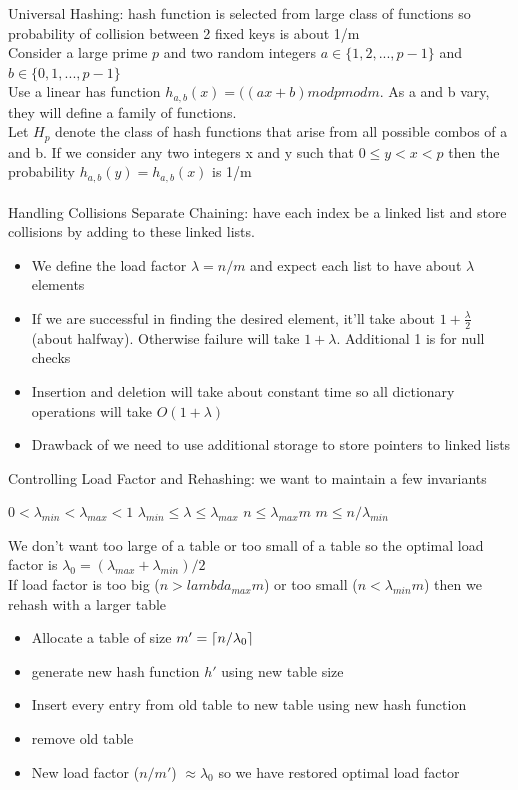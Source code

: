 \documentclass{article}
\DeclarePairedDelimiter{\ceil}{\lceil}{\rceil}
\begin{document}
  Universal Hashing: hash function is selected from large class of functions so probability of collision between 2 fixed keys is about 1/m\\
  Consider a large prime $p$ and two random integers $a \in \{1, 2, ..., p-1\}$ and $b \in \{0, 1, ..., p-1\}$ \\
  Use a linear has function $h_{a,b}(x) = ((ax + b) mod p mod m$. As a and b vary, they will define a family of functions.\\
  Let $H_{p}$ denote the class of hash functions that arise from all possible combos of a and b. If we consider any two integers x and y such that $0 \leq y < x < p$ then the probability $h_{a,b}(y) = h_{a,b}(x)$ is 1/m\\ \\
  Handling Collisions Separate Chaining: have each index be a linked list and store collisions by adding to these linked lists.
    \begin{itemize}[noitemsep]
    \item We define the load factor $\lambda = n/m$ and expect each list to have about $\lambda$ elements
    \item If we are successful in finding the desired element, it'll take about $1 + \frac{\lambda}{2}$ (about halfway). Otherwise failure will take $1 + \lambda$. Additional 1 is for null checks
    \item Insertion and deletion will take about constant time so all dictionary operations will take $O(1 + \lambda)$
    \item Drawback of we need to use additional storage to store pointers to linked lists
    \end{itemize}
  Controlling Load Factor and Rehashing: we want to maintain a few invariants
  \begin{center} 
    $0 < \lambda_{min} < \lambda_{max} < 1$ \quad $\lambda_{min} \leq \lambda \leq \lambda_{max}$ \quad $n \leq \lambda_{max}m$ \quad $m \leq n/\lambda_{min}$
  \end{center}
  We don't want too large of a table or too small of a table so the optimal load factor is $\lambda_{0} = (\lambda_{max} + \lambda_{min}) / 2$\\
  If load factor is too big ($n > lambda_{max}m$) or too small ($n < \lambda_{min}m$) then we rehash with a larger table
  \begin{itemize}
    \item Allocate a table of size $m' = \ceil{n/\lambda_{0}}$
    \item generate new hash function $h'$ using new table size
    \item Insert every entry from old table to new table using new hash function
    \item remove old table
    \item New load factor ($n/m'$) $\approx \lambda_{0}$ so we have restored optimal load factor
  \end{itemize}
\end{document}
